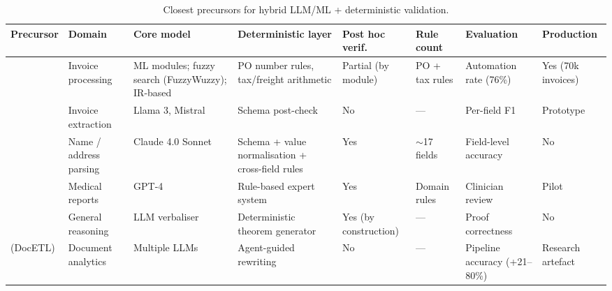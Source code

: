 \begin{table}[htbp]
\centering
\caption{Closest precursors for hybrid LLM/ML + deterministic validation.}
\label{tab:lr:precursors}
\scriptsize
\begin{adjustbox}{max width=\textwidth}
\begin{tabular}{@{}p{2.0cm}p{1.7cm}p{1.5cm}p{2.3cm}p{1.5cm}p{1.2cm}p{2.6cm}p{1.6cm}@{}}
\toprule
\textbf{Precursor} & \textbf{Domain} & \textbf{Core model} & \textbf{Deterministic layer} & \textbf{Post hoc verif.} & \textbf{Rule count} & \textbf{Evaluation} & \textbf{Production} \\
\midrule
\citet{kanaparthi2023}            & Invoice processing                            & ML modules; fuzzy search (FuzzyWuzzy); IR-based        & PO number rules, tax/freight arithmetic                  & Partial (by module)        & PO + tax rules        & Automation rate (76\%)                                  & Yes (70k invoices)  \\
\citet{loukil2024}                & Invoice extraction                            & Llama 3, Mistral       & Schema post-check                                        & No                         & ---             & Per-field F1                                            & Prototype           \\
\citet{tarannum2026}              & Name / address parsing                        & Claude 4.0 Sonnet          & Schema + value normalisation + cross-field rules         & Yes                        & $\sim$17 fields & Field-level accuracy                                    & No                  \\
\citet{prenosil2025}              & Medical reports                               & GPT-4                  & Rule-based expert system                                 & Yes                        & Domain rules    & Clinician review                                        & Pilot               \\
\citet{xu2025}                    & General reasoning                             & LLM verbaliser         & Deterministic theorem generator                          & Yes (by construction)      & ---             & Proof correctness                                       & No                  \\
\citet{shankar2025} (DocETL)    & Document analytics                            & Multiple LLMs          & Agent-guided rewriting                                   & No                         & ---             & Pipeline accuracy (+21--80\%)                           & Research artefact   \\

\end{tabular}
\end{adjustbox}
\end{table}
